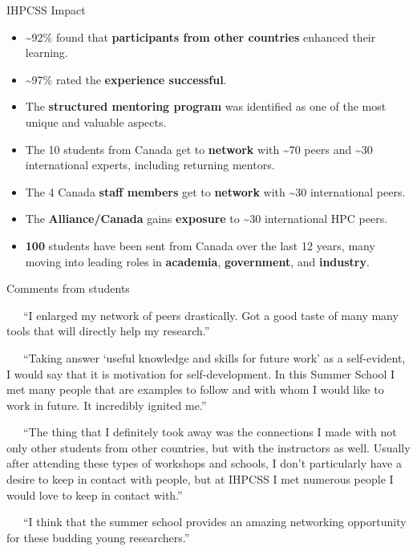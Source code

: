 \documentclass[
  11pt,
  ignorenonframetext,
  aspectratio=169,handout]{beamer}
\begin{document}
\begin{frame}{IHPCSS Impact}
\label{ihpcss-impact}
\begin{itemize}
\item
  \textasciitilde92\% found that \textbf{\alert{participants from other countries}} enhanced their learning.

  \pause
\item
  \textasciitilde97\% rated the \textbf{\alert{experience successful}}.

  \pause
\item
  The \textbf{\alert{structured mentoring program}} was identified as one of the most unique and valuable aspects.

  \pause
\item
  The 10 students from Canada get to \textbf{\alert{network}} with \textasciitilde70 peers and \textasciitilde30 international experts, including returning mentors.

  \pause
\item
  The 4 Canada \textbf{\alert{staff members}} get to \textbf{\alert{network}} with \textasciitilde30 international peers.

  \pause
\item
  The \textbf{\alert{Alliance/Canada}} gains \textbf{\alert{exposure}} to \textasciitilde30 international HPC peers.

  \pause
\item
  \textbf{\alert{100}} students have been sent from Canada over the last 12 years, many moving into leading roles in \textbf{\alert{academia}}, \textbf{\alert{government}}, and \textbf{\alert{industry}}.
\end{itemize}

\vspace{\baselineskip} \vspace{\baselineskip}
\end{frame}

\begin{frame}{Comments from students}
\label{comments-from-students}
\small\it

~~~``I enlarged my network of peers drastically. Got a good taste of many many tools that will directly help my research.''

~~~``Taking answer `useful knowledge and skills for future work' as a self-evident, I would say that it is motivation for self-development. In this Summer School I met many people that are examples to follow and with whom I would like to work in future. It incredibly ignited me.''

~~~``The thing that I definitely took away was the connections I made with not only other students from other countries, but with the instructors as well. Usually after attending these types of workshops and schools, I don't particularly have a desire to keep in contact with people, but at IHPCSS I met numerous people I would love to keep in contact with.''

~~~``I think that the summer school provides an amazing networking opportunity for these budding young researchers.''
\end{frame}
\end{document}
